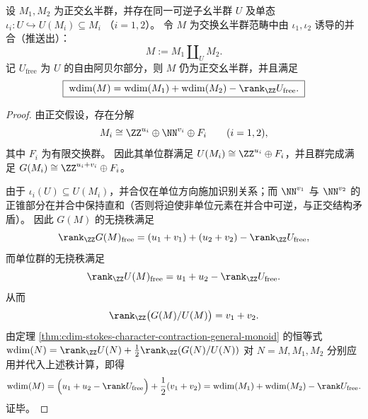 
\begin{theorem}\label{thm:cdim-orthogonal-amalgamated-wdim}
设 \(M_1,M_2\) 为正交幺半群，并存在同一可逆子幺半群 \(U\) 及单态
\(
\iota_i:U\hookrightarrow U(M_i)\subseteq M_i
\)
（\(i=1,2\)）。
令 \(M\) 为交换幺半群范畴中由 \(\iota_1,\iota_2\) 诱导的并合（推送出）：
\[
M:=M_1\amalg_{U}M_2.
\]
记 \(U_{\mathrm{free}}\) 为 \(U\) 的自由阿贝尔部分，则 \(M\) 仍为正交幺半群，并且满足
\[
\boxed{\;
\mathrm{wdim}(M)=\mathrm{wdim}(M_1)+\mathrm{wdim}(M_2)-\rank_{\ZZ}U_{\mathrm{free}}.\;}
\]
\end{theorem}
\begin{proof}
由正交假设，存在分解
\[
M_i\cong \ZZ^{u_i}\oplus \NN^{v_i}\oplus F_i
\qquad(i=1,2),
\]
其中 \(F_i\) 为有限交换群。
因此其单位群满足
\(
U(M_i)\cong \ZZ^{u_i}\oplus F_i
\)，并且群完成满足
\(
G(M_i)\cong \ZZ^{u_i+v_i}\oplus F_i
\)。
\par
由于 \(\iota_i(U)\subseteq U(M_i)\)，并合仅在单位方向施加识别关系；而 \(\NN^{v_1}\) 与 \(\NN^{v_2}\) 的正锥部分在并合中保持直和（否则将迫使非单位元素在并合中可逆，与正交结构矛盾）。
因此 \(G(M)\) 的无挠秩满足
\[
\rank_{\ZZ}G(M)_{\mathrm{free}}=(u_1+v_1)+(u_2+v_2)-\rank_{\ZZ}U_{\mathrm{free}},
\]
而单位群的无挠秩满足
\[
\rank_{\ZZ}U(M)_{\mathrm{free}}=u_1+u_2-\rank_{\ZZ}U_{\mathrm{free}}.
\]
从而
\[
\rank_{\ZZ}\bigl(G(M)/U(M)\bigr)=v_1+v_2.
\]
由定理 \ref{thm:cdim-stokes-character-contraction-general-monoid} 的恒等式
\(
\mathrm{wdim}(N)=\rank_{\ZZ}U(N)+\frac12\rank_{\ZZ}(G(N)/U(N))
\)
对 \(N=M,M_1,M_2\) 分别应用并代入上述秩计算，即得
\[
\mathrm{wdim}(M)
=\Bigl(u_1+u_2-\rank U_{\mathrm{free}}\Bigr)+\frac12(v_1+v_2)
=\mathrm{wdim}(M_1)+\mathrm{wdim}(M_2)-\rank U_{\mathrm{free}}.
\]
证毕。
\end{proof}

\endinput

